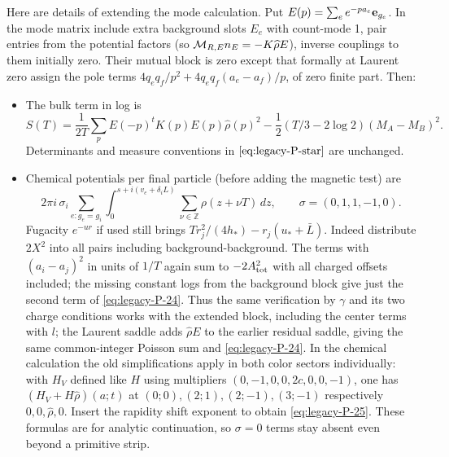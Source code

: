 Here are details of extending the mode calculation. Put \(E(p)=\sum_e e^{-p a_e}{\bf e}_{g_e}\). In the mode matrix include extra background slots \(E_e\) with count-mode 1, pair entries from the potential factors (so \({\cal M}_{R,E}n_E=-K\widehat\rho E\)), inverse couplings to them initially zero. Their mutual block is zero except that formally at Laurent zero assign the pole terms
\(4q_eq_f/p^2+4q_e q_f(a_e-a_f)/p\), of zero finite part. Then:


\begin{itemize}

\item 

The bulk term in log is
\begin{equation}
 S(T)=\frac1{2T}\sum_p E(-p)^t K(p) E(p)\widehat\rho(p)^2
 -\frac12(T/3-2\log2)(M_A-M_B)^2.
 \label{eq:legacy-P-24}
\end{equation}
Determinants and measure conventions in \(\eqref{eq:legacy-P-star}\) are unchanged.



\item 

Chemical potentials per final particle (before adding the magnetic test) are
\begin{equation}
 2\pi i\,\sigma_i\sum_{e:g_e=g_i}
 \int_0^{s+i(v_e+\delta_i L)}\sum_{\nu\in\mathbb Z}\rho(z+\nu T)\,dz ,
 \qquad \sigma=(0,1,1,-1,0).
 \label{eq:legacy-P-25}
\end{equation}
Fugacity \(e^{-u r}\) if used still brings \(T r_j^2/(4h_*)-r_j(u_*+\bar L)\).
Indeed distribute \(2X^2\) into all pairs including background-background. The terms with \((a_i-a_j)^2\) in units of \(1/T\) again sum to \(-2 A_{\rm tot}^2\) with all charged offsets included; the missing constant logs from the background block give just the second term of \eqref{eq:legacy-P-24}. Thus the same verification by \(\gamma\) and its two charge conditions works with the extended block, including the center terms with \(l\); the Laurent saddle adds \(\widehat\rho E\) to the earlier residual saddle, giving the same common-integer Poisson sum and \eqref{eq:legacy-P-24}. In the chemical calculation the old simplifications apply in both color sectors individually: with \(H_V\) defined like \(H\) using multipliers \((0,-1,0,0,2c,0,0,-1)\), one has \((H_V+H\widehat\rho)(a;t)\) at \((0;0),(2;1),(2;-1),(3;-1)\) respectively \(0,0,\widehat\rho,0\). Insert the rapidity shift exponent to obtain \eqref{eq:legacy-P-25}. These formulas are for analytic continuation, so \(\sigma=0\) terms stay absent even beyond a primitive strip.



\end{itemize}


